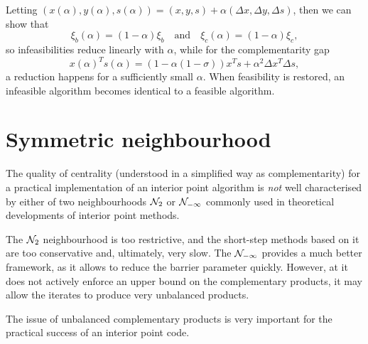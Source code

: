 Letting 
$(x(\alpha),y(\alpha),s(\alpha)) =(x,y,s)+\alpha(\Delta x,\Delta y,\Delta s)$,
then we can show that
\[
  \xi_b(\alpha) = (1-\alpha) \xi_b \quad \text{and} \quad 
  \xi_c(\alpha) = (1-\alpha) \xi_c,
\]
so infeasibilities reduce linearly with $\alpha$, while for the 
complementarity gap
\[
  x(\alpha)^Ts(\alpha)=(1-\alpha(1 -\sigma))x^Ts +\alpha^2 \Delta x^T \Delta s,
\]
a reduction happens for a sufficiently small $\alpha$. 
When feasibility is restored, an infeasible algorithm becomes identical
to a feasible algorithm. 


%
%
\section{Symmetric neighbourhood}
\label{sec:SymNeighbourhood}

The quality of centrality (understood in a simplified way as complementarity)
for a practical implementation of an interior point algorithm
is {\it not} well characterised by either of two neighbourhoods 
$\mathcal{N}_2$ or $\mathcal{N}_{-\infty}$ commonly used in theoretical developments 
of interior point methods.

The $\mathcal{N}_2$ neighbourhood is too restrictive, and the short-step methods
based on it are too conservative and, ultimately, very slow.
The $\mathcal{N}_{-\infty}$ provides a much better framework, as it allows to
reduce the barrier parameter quickly. However, at it does not actively
enforce an upper bound on the complementary products, it may allow the
iterates to produce very unbalanced products.

The issue of unbalanced complementary products is very important for
the practical success of an interior point code. 


